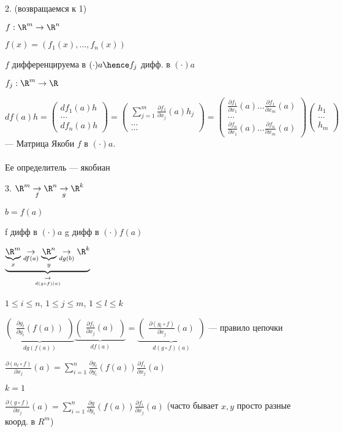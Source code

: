 2. (возвращаемся к 1)

$f : \R ^ m \to \R^n$

$f(x) = (f_1(x), ..., f_n(x))$

$f$ дифференцируема в $(\cdot) a \hence f_j$ дифф. в $(\cdot) a$


$f_j : \R^ m \to \R$

$df(a)h = \begin{pmatrix}
    df_1(a)h\\
    ...\\
    df_n(a)h
\end{pmatrix} = \begin{pmatrix}
    \sum_{j=1}^m \frac{\partial f_1}{\partial x_j}(a) h_j\\
    ...\\
    ... 
\end{pmatrix} = \begin{pmatrix}
    \frac{\partial f_1}{\partial x_1}(a) ... \frac{\partial f_1}{\partial x_m}(a) \\
    \dots \\
    \frac{\partial f_n}{\partial x_1}(a) ... \frac{\partial f_n}{\partial x_m}(a) 
\end{pmatrix} \begin{pmatrix}
    h_1\\
    ...\\
    h_m
\end{pmatrix}$ --- Матрица Якоби $f$ в $(\cdot) a$. \\ \\ Ее определитель --- якобиан


3. $\R^m \underset{f}{\to} \R^n \underset{g}{\to}  \R ^ k$

$b = f(a)$

f дифф в $(\cdot) a$
g дифф в $(\cdot) f(a)$

$\underbrace{\underbrace{\R ^ m}_{x} \underset{df(a)}{\to} \underbrace{\R ^ n}_{y} \underset{dg(b)}{\to} \R ^ k}_{\underset{d(g\circ f)(a)}{\to}}$

$1 \leqslant i \leqslant n$,
$1 \leqslant j \leqslant m$,
$1 \leqslant l \leqslant k$

$\underbrace{\begin{pmatrix}
    \frac{\partial g_l}{\partial y_i}(f(a))
\end{pmatrix}}_{dg(f(a))} \underbrace{\begin{pmatrix}
    \frac{\partial f_i}{\partial x_j}(a)
\end{pmatrix}}_{df(a)} = \underbrace{\begin{pmatrix}
    \frac{\partial (g_l \circ f)}{\partial x_j}(a)
\end{pmatrix}}_{d(g \circ f)(a)}$ --- правило цепочки

$\frac{\partial (a_l \circ f)}{\partial x_j}(a) = \sum_{i = 1}^{n} \frac{\partial g_l}{\partial y_i}(f(a)) \frac{\partial f_i}{\partial x_j}(a)$


$k = 1$

$\frac{\partial (g \circ f)}{\partial x_j}(a) = \sum_{i = 1} ^ n \frac{\partial g}{\partial y_i}(f(a)) \frac{\partial f_i}{\partial x_j}(a)$ (часто бывает $x, y$ просто разные коорд. в $R ^ m$)